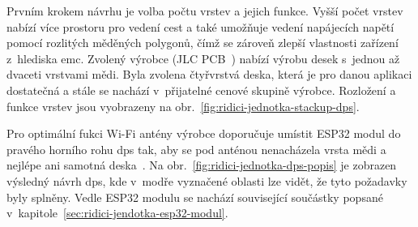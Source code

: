         Prvním krokem návrhu je volba počtu vrstev a jejich funkce. Vyšší počet vrstev nabízí více prostoru pro vedení cest a také umožňuje vedení napájecích napětí pomocí rozlitých měděných polygonů, čímž se zároveň zlepší vlastnosti zařízení z~hlediska \acs{emc}. Zvolený výrobce (JLC PCB~\cite{jlcpcb}) nabízí výrobu desek s~jednou až dvaceti vrstvami mědi. Byla zvolena čtyřvrstvá deska, která je pro danou aplikaci dostatečná a stále se nachází v~přijatelné cenové skupině výrobce. Rozložení a funkce vrstev jsou vyobrazeny na obr.~\ref{fig:ridici-jednotka-stackup-dps}.

        Pro optimální fukci Wi-Fi antény výrobce doporučuje umístit ESP32 modul do pravého horního rohu \acs{dps} tak, aby se pod anténou nenacházela vrsta mědi a nejlépe ani samotná deska~\cite{esp32-hw-guidelines}. Na obr.~\ref{fig:ridici-jednotka-dps-popis} je zobrazen výsledný návrh \acs{dps}, kde v~modře vyznačené oblasti lze vidět, že tyto požadavky byly splněny. Vedle ESP32 modulu se nachází související součástky popsané v~kapitole~\ref{sec:ridici-jendotka-esp32-modul}.

